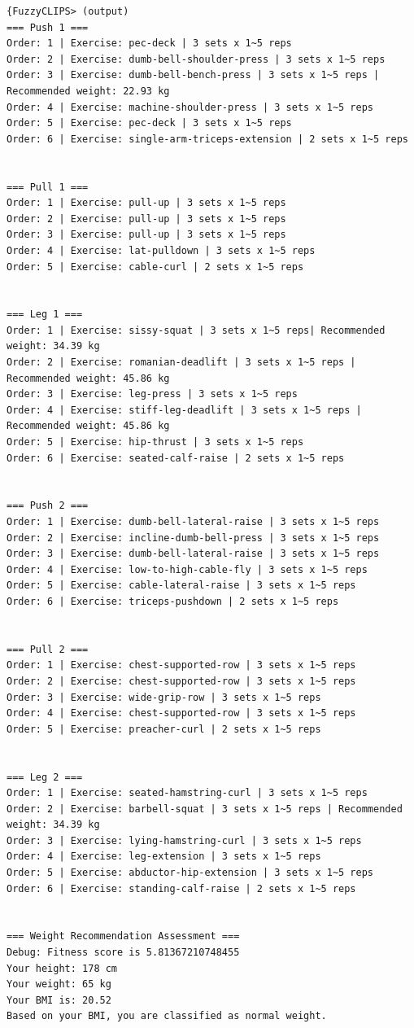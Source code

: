 \documentclass{article}
\begin{document}
\begin{verbatim}
{FuzzyCLIPS> (output)
=== Push 1 ===
Order: 1 | Exercise: pec-deck | 3 sets x 1~5 reps
Order: 2 | Exercise: dumb-bell-shoulder-press | 3 sets x 1~5 reps
Order: 3 | Exercise: dumb-bell-bench-press | 3 sets x 1~5 reps | Recommended weight: 22.93 kg
Order: 4 | Exercise: machine-shoulder-press | 3 sets x 1~5 reps
Order: 5 | Exercise: pec-deck | 3 sets x 1~5 reps
Order: 6 | Exercise: single-arm-triceps-extension | 2 sets x 1~5 reps


=== Pull 1 ===
Order: 1 | Exercise: pull-up | 3 sets x 1~5 reps
Order: 2 | Exercise: pull-up | 3 sets x 1~5 reps
Order: 3 | Exercise: pull-up | 3 sets x 1~5 reps
Order: 4 | Exercise: lat-pulldown | 3 sets x 1~5 reps
Order: 5 | Exercise: cable-curl | 2 sets x 1~5 reps


=== Leg 1 ===
Order: 1 | Exercise: sissy-squat | 3 sets x 1~5 reps| Recommended weight: 34.39 kg
Order: 2 | Exercise: romanian-deadlift | 3 sets x 1~5 reps | Recommended weight: 45.86 kg
Order: 3 | Exercise: leg-press | 3 sets x 1~5 reps
Order: 4 | Exercise: stiff-leg-deadlift | 3 sets x 1~5 reps | Recommended weight: 45.86 kg
Order: 5 | Exercise: hip-thrust | 3 sets x 1~5 reps
Order: 6 | Exercise: seated-calf-raise | 2 sets x 1~5 reps


=== Push 2 ===
Order: 1 | Exercise: dumb-bell-lateral-raise | 3 sets x 1~5 reps
Order: 2 | Exercise: incline-dumb-bell-press | 3 sets x 1~5 reps
Order: 3 | Exercise: dumb-bell-lateral-raise | 3 sets x 1~5 reps
Order: 4 | Exercise: low-to-high-cable-fly | 3 sets x 1~5 reps
Order: 5 | Exercise: cable-lateral-raise | 3 sets x 1~5 reps
Order: 6 | Exercise: triceps-pushdown | 2 sets x 1~5 reps


=== Pull 2 ===
Order: 1 | Exercise: chest-supported-row | 3 sets x 1~5 reps
Order: 2 | Exercise: chest-supported-row | 3 sets x 1~5 reps
Order: 3 | Exercise: wide-grip-row | 3 sets x 1~5 reps
Order: 4 | Exercise: chest-supported-row | 3 sets x 1~5 reps
Order: 5 | Exercise: preacher-curl | 2 sets x 1~5 reps


=== Leg 2 ===
Order: 1 | Exercise: seated-hamstring-curl | 3 sets x 1~5 reps
Order: 2 | Exercise: barbell-squat | 3 sets x 1~5 reps | Recommended weight: 34.39 kg
Order: 3 | Exercise: lying-hamstring-curl | 3 sets x 1~5 reps
Order: 4 | Exercise: leg-extension | 3 sets x 1~5 reps
Order: 5 | Exercise: abductor-hip-extension | 3 sets x 1~5 reps
Order: 6 | Exercise: standing-calf-raise | 2 sets x 1~5 reps


=== Weight Recommendation Assessment ===
Debug: Fitness score is 5.81367210748455
Your height: 178 cm
Your weight: 65 kg
Your BMI is: 20.52
Based on your BMI, you are classified as normal weight.


\end{verbatim}
\end{document}
